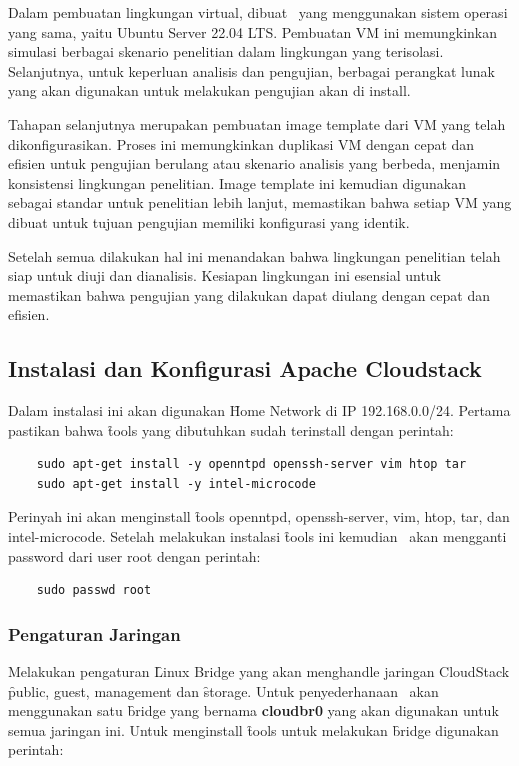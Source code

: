 Dalam pembuatan lingkungan virtual, dibuat \vm\ yang menggunakan sistem operasi yang sama, yaitu Ubuntu Server 22.04 LTS. Pembuatan VM ini memungkinkan simulasi berbagai skenario penelitian dalam lingkungan yang terisolasi. Selanjutnya, untuk keperluan analisis dan pengujian, berbagai perangkat lunak yang akan digunakan untuk melakukan pengujian akan di install.

Tahapan selanjutnya merupakan pembuatan image template dari VM yang telah dikonfigurasikan. Proses ini memungkinkan duplikasi VM dengan cepat dan efisien untuk pengujian berulang atau skenario analisis yang berbeda, menjamin konsistensi lingkungan penelitian. Image template ini kemudian digunakan sebagai standar untuk penelitian lebih lanjut, memastikan bahwa setiap VM yang dibuat untuk tujuan pengujian memiliki konfigurasi yang identik.

Setelah semua dilakukan hal ini menandakan bahwa lingkungan penelitian telah siap untuk diuji dan dianalisis. Kesiapan lingkungan ini esensial untuk memastikan bahwa pengujian yang dilakukan dapat diulang dengan cepat dan efisien.

\subsection{Instalasi dan Konfigurasi Apache Cloudstack}
Dalam instalasi ini akan digunakan \f{Home Network} di IP 192.168.0.0/24. Pertama pastikan bahwa \f{tools} yang dibutuhkan sudah terinstall dengan perintah:

\begin{verbatim}
    sudo apt-get install -y openntpd openssh-server vim htop tar
    sudo apt-get install -y intel-microcode
\end{verbatim}

Perinyah ini akan menginstall \f{tools} openntpd, openssh-server, vim, htop, tar, dan intel-microcode. Setelah melakukan instalasi \f{tools} ini kemudian \saya\ akan mengganti password dari user root dengan perintah:

\begin{verbatim}
    sudo passwd root
\end{verbatim}

\subsubsection{Pengaturan Jaringan}
Melakukan pengaturan \f{Linux Bridge} yang akan menghandle jaringan CloudStack \f{public, guest, management} dan \f{storage}. Untuk penyederhanaan \saya\ akan menggunakan satu \f{bridge} yang bernama \textbf{cloudbr0} yang akan digunakan untuk semua jaringan ini. Untuk menginstall \f{tools} untuk melakukan \f{bridge} digunakan perintah:

